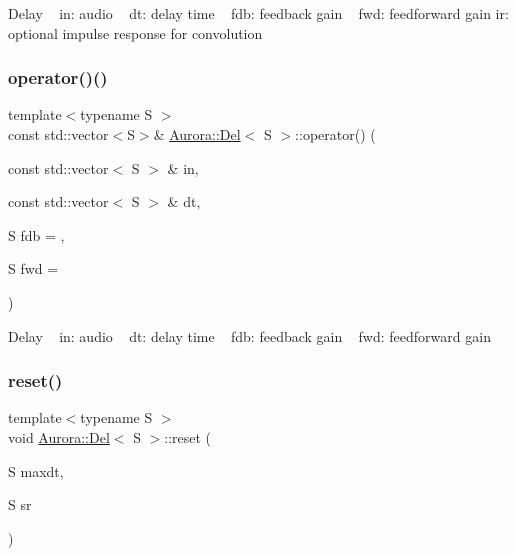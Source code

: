 Delay ~\newline
in\+: audio ~\newline
dt\+: delay time ~\newline
fdb\+: feedback gain ~\newline
fwd\+: feedforward gain ir\+: optional impulse response for convolution \mbox{\label{class_aurora_1_1_del_a7b07356cf07e48791929e7c99c907650}} 
\subsubsection{\texorpdfstring{operator()()}{operator()()}\hspace{0.1cm}{\footnotesize\ttfamily [4/4]}}
{\footnotesize\ttfamily template$<$typename S $>$ \\
const std\+::vector$<$S$>$\& \hyperlink{class_aurora_1_1_del}{Aurora\+::\+Del}$<$ S $>$\+::operator() (\begin{DoxyParamCaption}\item[{const std\+::vector$<$ S $>$ \&}]{in,  }\item[{const std\+::vector$<$ S $>$ \&}]{dt,  }\item[{S}]{fdb = {},  }\item[{S}]{fwd = {} }\end{DoxyParamCaption})\hspace{0.3cm}{\ttfamily [inline]}}

Delay ~\newline
in\+: audio ~\newline
dt\+: delay time ~\newline
fdb\+: feedback gain ~\newline
fwd\+: feedforward gain \mbox{\label{class_aurora_1_1_del_a1d5f6aa043e47077b3c1654d884c77f1}} 
\subsubsection{\texorpdfstring{reset()}{reset()}\hspace{0.1cm}{\footnotesize\ttfamily [1/2]}}
{\footnotesize\ttfamily template$<$typename S $>$ \\
void \hyperlink{class_aurora_1_1_del}{Aurora\+::\+Del}$<$ S $>$\+::reset (\begin{DoxyParamCaption}\item[{S}]{maxdt,  }\item[{S}]{sr }\end{DoxyParamCaption})\hspace{0.3cm}{\ttfamily [inline]}}

